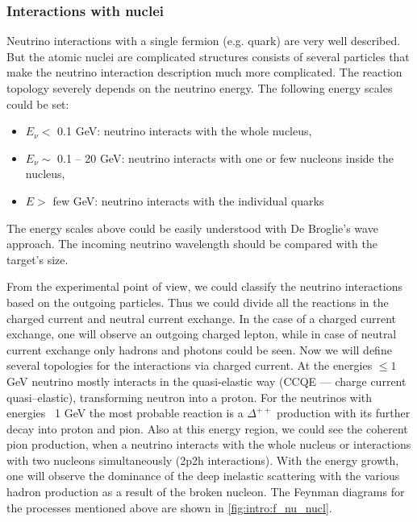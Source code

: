 \documentclass[../main.tex]{subfiles}
\begin{document}
\subsubsection{Interactions with nuclei}
\label{sec:intro:nuclei}
Neutrino interactions with a single fermion (e.g. quark) are very well described. But the atomic nuclei are complicated structures consists of several particles that make the neutrino interaction description much more complicated. The reaction topology severely depends on the neutrino energy. The following energy scales could be set:
\begin{itemize}
  \item $E_\nu <$ 0.1 GeV: neutrino interacts with the whole nucleus,
  \item $E_\nu\sim$ 0.1 -- 20 GeV: neutrino interacts with one or few nucleons inside the nucleus,
  \item $E>$ few GeV: neutrino interacts with the individual quarks
\end{itemize}

The energy scales above could be easily understood with De Broglie's wave approach. The incoming neutrino wavelength should be compared with the target's size.

From the experimental point of view, we could classify the neutrino interactions based on the outgoing particles. Thus we could divide all the reactions in the charged current and neutral current exchange. In the case of a charged current exchange, one will observe an outgoing charged lepton, while in case of neutral current exchange only hadrons and photons could be seen. Now we will define several topologies for the interactions via charged current. At the energies $\le1$ GeV neutrino mostly interacts in the quasi-elastic way (CCQE --- charge current quasi--elastic), transforming neutron into a proton. For the neutrinos with energies ~1 GeV the most probable reaction is a $\Delta^{++}$ production with its further decay into proton and pion. Also at this energy region, we could see the coherent pion production, when a neutrino interacts with the whole nucleus or interactions with two nucleons simultaneously (2p2h interactions). With the energy growth, one will observe the dominance of the deep inelastic scattering with the various hadron production as a result of the broken nucleon. The Feynman diagrams for the processes mentioned above are shown in \autoref{fig:intro:f_nu_nucl}.
\end{document}
